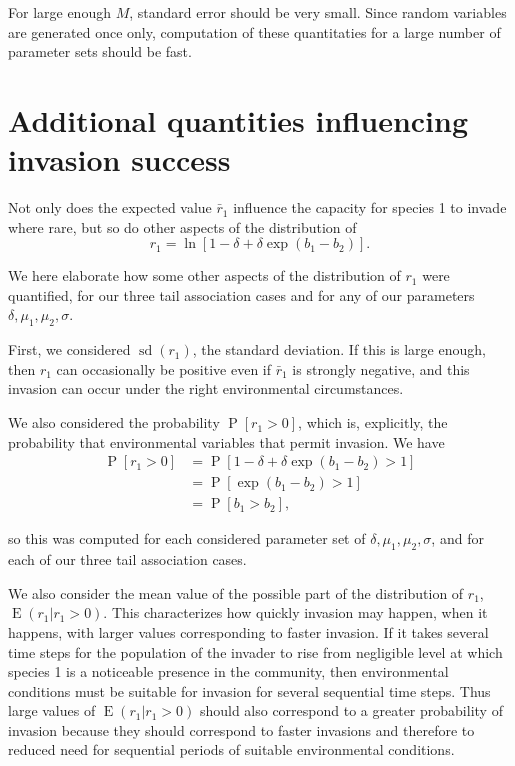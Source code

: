 \documentclass[letterpaper,11pt]{article}
\DeclareMathOperator{\EX}{E}%
\DeclareMathOperator{\sd}{sd}
\DeclareMathOperator{\Prob}{P}
\begin{document}
\noindent For large enough $M$, standard error should be very small. Since random variables are generated once only, computation of these quantitaties for a large number of parameter sets should be fast. 


\section{Additional quantities influencing invasion success} \label{sect:addquant}

Not only does the expected value $\bar r_1$ influence the capacity for species 1 to invade where rare, but so do other aspects of the distribution of
\begin{equation}
r_1 = \ln[1-\delta+\delta \exp(b_1-b_2)]. \label{r1_distribution}
\end{equation}

We here elaborate how some other aspects of the distribution of $r_1$ were quantified, for our three tail association cases and for any of our parameters $\delta, \mu_1, \mu_2, \sigma$. 

First, we considered $\sd(r_1)$, the standard deviation. If this is large enough, then $r_1$ can occasionally be positive even if $\bar r_1$ is strongly negative, and this invasion can occur under the right environmental circumstances.

We also considered the probability $\Prob[r_1 >0]$, which is, explicitly, the probability that environmental variables that permit invasion. We have
\begin{align}
\Prob[r_1>0] &= \Prob [1-\delta+\delta \exp(b_1-b_2) > 1] \\
&= \Prob[\exp (b_1-b_2)>1] \\
&= \Prob[b_1>b_2],
\end{align}

\noindent so this was computed for each considered parameter set of $\delta, \mu_1, \mu_2, \sigma$, and for each of our three tail association cases. 

We also consider the mean value of the possible part of the distribution of $r_1$, $\EX(r_1|r_1>0)$. This characterizes how quickly invasion may happen, when it happens, with larger values corresponding to faster invasion. If it takes several time steps for the population of the invader to rise from negligible level at which species 1 is a noticeable presence in the community, then environmental conditions must be suitable for invasion for several sequential time steps. Thus large values of $\EX(r_1|r_1>0)$ should also correspond to a greater probability of invasion because they should correspond to faster invasions and therefore to reduced need for sequential periods of suitable environmental conditions. 
\end{document}
